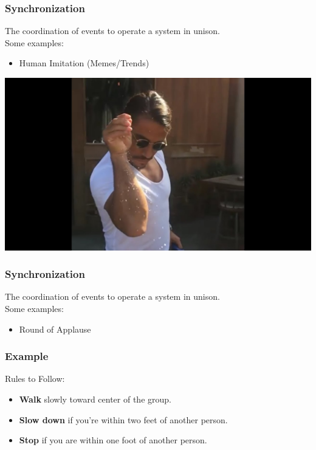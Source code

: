 \documentclass[xcolor=dvipsnames]{beamer}
\begin{document}
\begin{frame}
	\frametitle{Synchronization}
	The coordination of events to operate a system in unison.\\ 
	Some examples:
	\begin{itemize}
		\item Human Imitation (Memes/Trends) 
	\end{itemize}
	\begin{center}
	\includegraphics[scale=0.15]{images/salt_guy.jpg}
	\end{center}
\end{frame}

\begin{frame}
	\frametitle{Synchronization}
	The coordination of events to operate a system in unison.\\ 
	Some examples:
	\begin{itemize}
		\item Round of Applause
	\end{itemize}
	\vspace{100 pt}
\end{frame}


\begin{frame}
	\frametitle{Example}
\noindent Rules to Follow:
\begin{itemize}
	\item \textbf{Walk} slowly toward center of the group.
	\item \textbf{Slow down} if you're within two feet of another person.
	\item \textbf{Stop} if you are within one foot of another person.
\end{itemize}

\centering
{} 
\end{frame}
\end{document}
